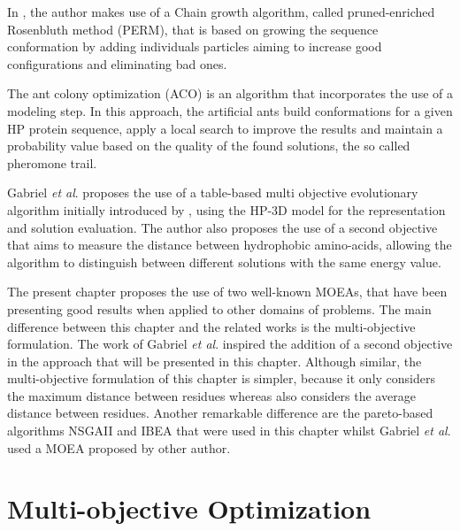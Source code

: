 In \cite{hsu2003growth}, the author makes use of a Chain growth algorithm, called pruned-enriched Rosenbluth method (PERM), that is based on growing the sequence conformation by adding individuals particles aiming to increase good configurations and eliminating bad ones.


The ant colony optimization (ACO) \cite{shmygelska2002ant, shmygelska2003improved} is an algorithm that incorporates the use of a modeling step. In this approach, the artificial ants build conformations for a given HP protein sequence, apply a local search to improve the results and maintain a probability value based on the quality of the found solutions, the so called pheromone trail.


Gabriel \textit{et al}. \cite{gabriel2012algoritmos} proposes the use of a table-based multi objective evolutionary algorithm initially introduced by \cite{delbem2002restabelecimento}, using the HP-3D model for the representation and solution evaluation. The author also proposes the use of a second objective that aims to measure the distance between hydrophobic amino-acids, allowing the algorithm to distinguish between different solutions with the same energy value.


The present chapter proposes the use of two well-known MOEAs, that have been presenting good results when applied to other domains of problems. The main difference between this chapter and the related works \cite{hsu2003growth,krasnogor2002multimeme,shmygelska2002ant,shmygelska2003improved,unger1993genetic} is the multi-objective formulation. The work of Gabriel \textit{et al}. \cite{gabriel2012algoritmos} inspired the addition of a second objective in the approach that will be presented in this chapter. Although similar, the multi-objective formulation of this chapter is simpler, because it only considers the maximum distance between residues whereas \cite{gabriel2012algoritmos} also considers the average distance between residues. 
Another remarkable difference are the pareto-based algorithms NSGAII and IBEA that were used in this chapter whilst  Gabriel \textit{et al}. \cite{gabriel2012algoritmos} used a MOEA proposed by other author.    




\section{Multi-objective Optimization} \label{sec:optimization}



